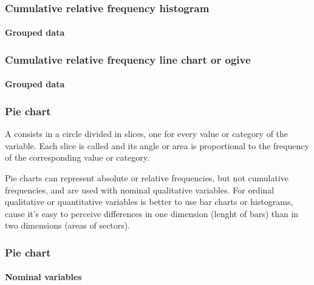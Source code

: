 \begin{frame}
\frametitle{Cumulative relative frequency histogram}
\framesubtitle{Grouped data}
\begin{center}
\scalebox{0.6}{}
\end{center} 
\end{frame}


\begin{frame}
\frametitle{Cumulative relative frequency line chart or ogive}
\framesubtitle{Grouped data}
\begin{center}
\scalebox{0.6}{} 
\end{center} 
\end{frame}
 

\begin{frame}
\frametitle{Pie chart}
A  consists in a circle divided in slices, one for every value or category of the variable. 
Each slice is called  and its angle or area is proportional to the frequency of the corresponding
value or category. 

Pie charts can represent absolute or relative frequencies, but not cumulative frequencies, and are used with nominal
qualitative variables.
For ordinal qualitative or quantitative variables is better to use bar charts or histograms, cause it's easy to perceive
differences in one dimension (lenght of bars) than in two dimensions (areas of sectors).
\end{frame}


\begin{frame}
\frametitle{Pie chart}
\framesubtitle{Nominal variables}
\begin{center}
\scalebox{0.6}{}
\end{center}
\end{frame}



